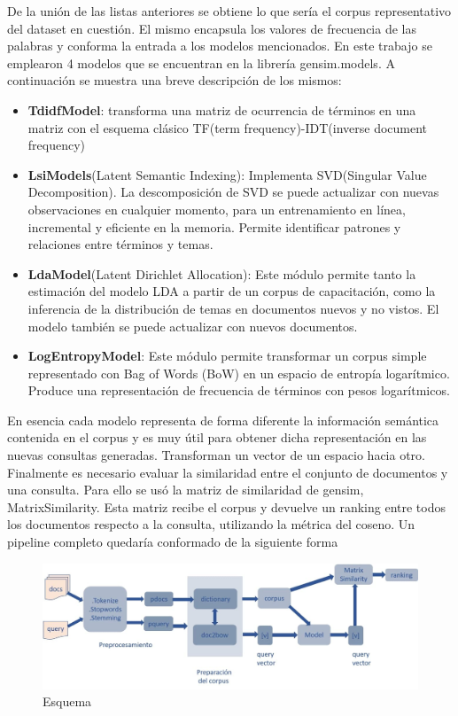 \documentclass{llncs}
\begin{document}
De la unión de las listas anteriores se obtiene lo que sería el corpus representativo del dataset en cuestión. 
El mismo encapsula los valores de frecuencia de las palabras y conforma la entrada a los modelos mencionados. En este trabajo se emplearon 4 modelos que se encuentran en la librería gensim.models. A continuación se muestra una breve descripción de los mismos:
\begin{itemize}
	\item \textbf{TdidfModel}: transforma una matriz de ocurrencia de términos en una matriz con el esquema clásico TF(term frequency)-IDT(inverse document frequency)
	\item \textbf{LsiModels}(Latent Semantic Indexing): Implementa SVD(Singular Value Decomposition). La descomposición de SVD se puede actualizar con nuevas observaciones en cualquier momento, para un entrenamiento en línea, incremental y eficiente en la memoria. Permite identificar patrones y relaciones entre términos y temas. 
	\item \textbf{LdaModel}(Latent Dirichlet Allocation): Este módulo permite tanto la estimación del modelo LDA a partir de un corpus de capacitación, como la inferencia de la distribución de temas en documentos nuevos y no vistos. El modelo también se puede actualizar con nuevos documentos.
	\item \textbf{LogEntropyModel}: Este módulo permite transformar un corpus simple representado con Bag of Words (BoW) en un espacio de entropía logarítmico. Produce una representación de frecuencia de términos con pesos logarítmicos.
	
\end{itemize}

	En esencia cada modelo representa de forma diferente la información semántica contenida en el corpus y es muy útil para obtener dicha representación en las nuevas consultas generadas. Transforman un vector de un espacio hacia otro.
Finalmente es necesario evaluar la similaridad entre el conjunto de documentos y una consulta. Para ello se usó la matriz de similaridad de gensim, MatrixSimilarity. Esta matriz recibe el corpus y devuelve un ranking entre todos los documentos respecto a la consulta, utilizando la métrica del coseno.
Un pipeline completo quedaría conformado de la siguiente forma

\begin{figure}
	\begin{center}
		\includegraphics[width=\linewidth]{ ./images/vect.jpg}
		\caption{Esquema}
		\label{vect}
	\end{center}
\end{figure}
\end{document}
